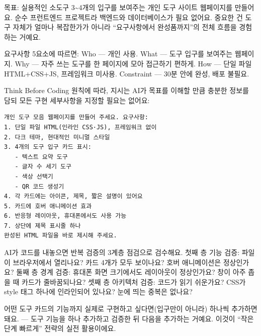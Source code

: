 



목표: 실용적인 소도구 3\textasciitilde{}4개의 입구를 보여주는 개인 도구 사이트 웹페이지를 만들어요. 순수 프런트엔드 프로젝트라 백엔드와 데이터베이스가 필요 없어요. 중요한 건 도구 자체가 얼마나 복잡한가가 아니라 “요구사항에서 완성품까지”의 전체 흐름을 경험하는 거예요.

요구사항 5요소에 따르면: Who — 개인 사용. What — 도구 입구를 보여주는 웹페이지. Why — 자주 쓰는 도구를 한 페이지에 모아 접근하기 편하게. How — 단일 파일 HTML+CSS+JS, 프레임워크 미사용. Constraint — 30분 안에 완성, 배포 불필요.


Think Before Coding 원칙에 따라, 지시는 AI가 목표를 이해할 만큼 충분한 정보를 담되 모든 구현 세부사항을 지정할 필요는 없어요:

\begin{lstlisting}
개인 도구 모음 웹페이지를 만들어 주세요. 요구사항:
1. 단일 파일 HTML(인라인 CSS·JS), 프레임워크 없이
2. 다크 테마, 현대적인 미니멀 스타일
3. 4개의 도구 입구 카드 표시:
   - 텍스트 요약 도구
   - 글자 수 세기 도구
   - 색상 선택기
   - QR 코드 생성기
4. 각 카드에는 아이콘, 제목, 짧은 설명이 있어요
5. 카드에 호버 애니메이션 효과
6. 반응형 레이아웃, 휴대폰에서도 사용 가능
7. 상단에 제목 표시줄 하나
완성된 HTML 파일을 바로 제시해 주세요.
\end{lstlisting}


AI가 코드를 내놓으면 반복 검증의 3계층 점검으로 검수해요. 첫째 층 기능 검증: 파일이 브라우저에서 열리나요? 카드 4개가 모두 보이나요? 호버 애니메이션은 정상인가요? 둘째 층 경계 검증: 휴대폰 화면 크기에서도 레이아웃이 정상인가요? 창이 아주 좁을 때 카드가 줄바꿈되나요? 셋째 층 아키텍처 검증: 코드가 읽기 쉬운가요? CSS가 style 태그 하나에 인라인되어 있나요? 눈에 띄는 중복은 없나요?

어떤 도구 카드의 기능까지 실제로 구현하고 싶다면(입구만이 아니라) 하나씩 추가하면 돼요. — 도구 기능을 하나 추가하고 검증한 뒤 다음을 추가하는 거예요. 이것이 “작은 단계 빠르게” 전략의 실전 활용이에요.

